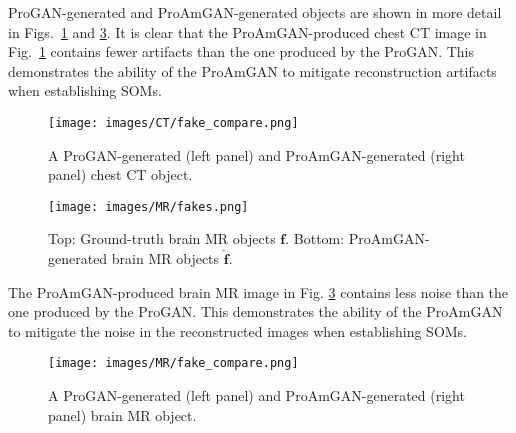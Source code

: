 \documentclass[journal]{IEEEtran}
\renewcommand{\vec}[1]{\mathbf{#1}}
\begin{document}
ProGAN-generated and ProAmGAN-generated objects are shown in more detail in Figs.~\ref{fig:progan_ct} and \ref{fig:mr_fake_compare}.
It is clear that the ProAmGAN-produced chest CT image in Fig.~\ref{fig:progan_ct} contains fewer artifacts than the one produced by the ProGAN.
This demonstrates the ability of the ProAmGAN to mitigate reconstruction artifacts when establishing SOMs.
\vspace{-0.35cm}
\begin{figure}[H]
	\centering
	\texttt{[image: images/CT/fake\_compare.png]}
	\vspace{-0.45cm}
	\caption{A ProGAN-generated (left panel) and ProAmGAN-generated (right panel) chest CT object.}
	\label{fig:progan_ct}
\vspace{-0.3cm}
\end{figure}


\vspace{-0.2cm}
\begin{figure}[H]
	\centering
	\texttt{[image: images/MR/fakes.png]}
	 \caption{Top: Ground-truth brain MR objects $\vec{f}$. Bottom: ProAmGAN-generated brain MR objects $\hat{\vec{f}}$.}
	\label{fig:mr_fake}
\vspace{-0.2cm}%
\end{figure}  
  
The ProAmGAN-produced brain MR image in Fig. \ref{fig:mr_fake_compare} contains less noise than the one produced by the ProGAN.
This demonstrates the ability of the ProAmGAN to mitigate the noise in the reconstructed images when establishing SOMs.
\vspace{-0.2cm}
\begin{figure}[H]
	\centering
	\texttt{[image: images/MR/fake\_compare.png]}
	\vspace{-0.3cm}
	\caption{A ProGAN-generated (left panel) and ProAmGAN-generated (right panel) brain MR object.}
	\label{fig:mr_fake_compare}
\end{figure}
\end{document}
